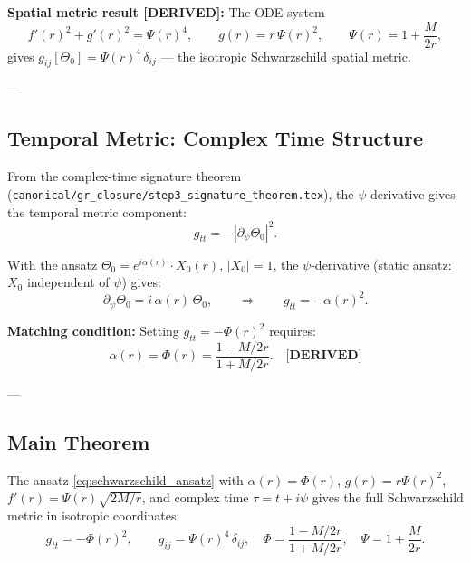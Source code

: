 \noindent\textbf{Spatial metric result [DERIVED]:}
The ODE system
\begin{equation}
  f'(r)^2 + g'(r)^2 = \Psi(r)^4,\qquad
  g(r) = r\,\Psi(r)^2,\qquad
  \Psi(r) = 1 + \frac{M}{2r},
  \label{eq:schwarzschild_ode}
\end{equation}
gives $g_{ij}[\Theta_0] = \Psi(r)^4\,\delta_{ij}$ — the isotropic Schwarzschild
spatial metric.

---

\subsection{Temporal Metric: Complex Time Structure}

From the complex-time signature theorem
(\texttt{canonical/gr\_closure/step3\_signature\_theorem.tex}), the
$\psi$-derivative gives the temporal metric component:
\begin{equation}
  g_{tt} = -|\partial_\psi\Theta_0|^2.
  \label{eq:g_tt_psi}
\end{equation}

With the ansatz $\Theta_0 = e^{i\alpha(r)}\cdot X_0(r)$, $|X_0|=1$, the
$\psi$-derivative (static ansatz: $X_0$ independent of $\psi$) gives:
\begin{equation}
  \partial_\psi\Theta_0 = i\,\alpha(r)\,\Theta_0,
  \qquad\Longrightarrow\qquad
  g_{tt} = -\alpha(r)^2.
  \label{eq:g_tt_alpha}
\end{equation}

\noindent\textbf{Matching condition:} Setting $g_{tt} = -\Phi(r)^2$ requires:
\begin{equation}
  \alpha(r) = \Phi(r) = \frac{1 - M/2r}{1 + M/2r}.
  \label{eq:alpha_matching}
  \quad\textbf{[DERIVED]}
\end{equation}

---

\subsection{Main Theorem}

\begin{theorem}
\label{thm:schwarzschild_full}
The ansatz \eqref{eq:schwarzschild_ansatz} with $\alpha(r) = \Phi(r)$,
$g(r) = r\Psi(r)^2$, $f'(r) = \Psi(r)\sqrt{2M/r}$, and complex time
$\tau = t + i\psi$ gives the full Schwarzschild metric in isotropic coordinates:
\begin{equation}
  \boxed{g_{tt} = -\Phi(r)^2,\qquad
  g_{ij} = \Psi(r)^4\,\delta_{ij},}
  \quad \Phi = \frac{1-M/2r}{1+M/2r},\quad \Psi = 1+\frac{M}{2r}.
  \label{eq:schwarzschild_full}
\end{equation}
\end{theorem}


